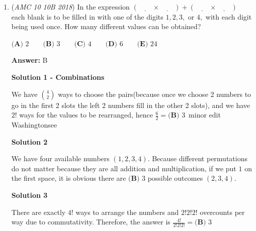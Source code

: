 \begin{enumerate}
 



\textbf{Solution 2}

Suppose that Sam's average speed during the last $30$ minutes was $x$ mph.

 Note that Sam's average speed during the entire trip was $\frac{96}{3/2}=64$ mph. Since Sam drove at $60$ mph, $65$ mph, and $x$ mph for the same duration ($30$ minutes each), his average speed during the entire trip was the average of $60$ mph, $65$ mph, and $x$ mph. We have
 \begin{align*} \frac{60+65+x}{3}&=64 \\ 60+65+x&=192 \\ x&=\boxed{\textbf{(D) } 67}. \end{align*}
~coolmath\_2018 ~MRENTHUSIASM

 


	\item (\textit{AMC 10 10B 2018}) In the expression $\left(\underline{\qquad}\times\underline{\qquad}\right)+\left(\underline{\qquad}\times\underline{\qquad}\right)$ each blank is to be filled in with one of the digits $1,2,3,$ or $4,$ with each digit being used once. How many different values can be obtained?


 $\textbf{(A) }2 \qquad \textbf{(B) }3 \qquad \textbf{(C) }4 \qquad \textbf{(D) }6 \qquad \textbf{(E) }24 \qquad$

 \textbf{Answer: }B



\textbf{Solution 1 - Combinations}

We have $\binom{4}{2}$ ways to choose the pairs(because once we choose 2 numbers to go in the first 2 slots the left 2 numbers fill in the other 2 slots), and we have $2!$ ways for the values to be rearranged, hence $\frac{6}{2}=\boxed{\textbf{(B) }3}$~minor edit Washingtonsee

 



\textbf{Solution 2}

We have four available numbers $(1, 2, 3, 4)$. Because different permutations do not matter because they are all addition and multiplication, if we put $1$ on the first space, it is obvious there are $\boxed{\textbf{(B) }3}$ possible outcomes $(2, 3, 4)$.

 



\textbf{Solution 3}

There are exactly $4!$ ways to arrange the numbers and $2!2!2!$ overcounts per way due to commutativity. Therefore, the answer is $\frac{4!}{2!2!2!}=\boxed{\textbf{(B) }3}$





\end{enumerate}
